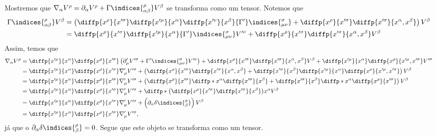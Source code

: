 Mostremos que \(\nabla_{\alpha} V^\rho = \partial_\alpha V^\rho + \Gamma\indices{^\rho_{\alpha \beta}}V^\beta\) se transforma como um tensor. Notemos que
\begin{align*}
    \Gamma\indices{^\rho_{\alpha \beta}}V^\beta &= \left(\diffp{x^\rho}{x'^\sigma}\diffp{x'^\mu}{x^\alpha} \diffp{x'^\nu}{x^\beta}{\Gamma'}\indices{^\sigma_{\mu\nu}} + \diffp{x^\rho}{x'^\sigma}\diffp{x'^\sigma}{x^\alpha,x^\beta}\right)V^\beta\\
                                                &= \diffp{x^\rho}{x'^\sigma}\diffp{x'^\mu}{x^\alpha} {\Gamma'}\indices{^\sigma_{\mu\nu}}V'^\nu + \diffp{x^\rho}{x'^\sigma}\diffp{x'^\sigma}{x^\alpha,x^\beta}V^\beta
\end{align*}
Assim, temos que
\begin{align*}
    \nabla_\alpha V^\rho &= \diffp{x'^\mu}{x^\alpha}\diffp{x^\rho}{x'^\sigma}\left(\partial'_\mu V'^\sigma + {\Gamma'}\indices{^\sigma_{\mu\nu}}V'^\nu\right)+ \diffp{x^\rho}{x'^\sigma}\diffp{x'^\sigma}{x^\alpha,x^\beta}V^\beta + \diffp{x'^\mu}{x^\alpha} \diffp{x^\rho}{x'^\mu,x'^\sigma} V'^\sigma\\
                         &=\diffp{x'^\mu}{x^\alpha}\diffp{x^\rho}{x'^\sigma}\nabla'_\mu V'^\sigma + \left(\diffp{x^\rho}{x'^\sigma}\diffp{x'^\sigma}{x^\alpha,x^\beta} + \diffp{x'^\sigma}{x^\beta}\diffp{x'^\mu}{x^\alpha} \diffp{x^\rho}{x'^\mu,x'^\sigma}\right) V^\beta\\
                         &=\diffp{x'^\mu}{x^\alpha}\diffp{x^\rho}{x'^\sigma}\nabla'_\mu V'^\sigma + \left(\diffp{x^\rho}{x'^\sigma}\diffp*{}{x^\alpha}\diffp{x'^\sigma}{x^\beta} + \diffp{x'^\sigma}{x^\beta}\diffp*{}{x^\alpha} \diffp{x^\rho}{x'^\sigma}\right) V^\beta\\
                         &=\diffp{x'^\mu}{x^\alpha}\diffp{x^\rho}{x'^\sigma}\nabla'_\mu V'^\sigma + \diffp*{\left(\diffp{x^\rho}{x'^\sigma} \diffp{x'^\sigma}{x^\beta}\right)}{x^\alpha} V^\beta\\
                         &=\diffp{x'^\mu}{x^\alpha}\diffp{x^\rho}{x'^\sigma}\nabla'_\mu V'^\sigma + \left(\partial_\alpha \delta\indices{^{\rho}_{\beta}}\right)V^\beta\\
                         &=\diffp{x'^\mu}{x^\alpha}\diffp{x^\rho}{x'^\sigma}\nabla'_\mu V'^\sigma,
\end{align*}
já que o \(\partial_\alpha \delta\indices{^\rho_\beta} = 0\). Segue que este objeto se transforma como um tensor.
